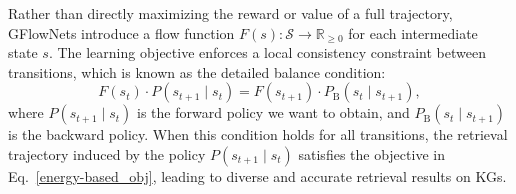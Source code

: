 Rather than directly maximizing the reward or value of a full trajectory, GFlowNets introduce a flow function $F(s): \mathcal{S} \rightarrow \mathbb{R}_{\ge 0}$ for each intermediate state $s$. 
The learning objective enforces a local consistency constraint between transitions, which is known as the detailed balance condition:
\begin{equation} 
F(s_t) \cdot P(s_{t+1} \mid s_t) = F(s_{t+1}) \cdot P_{\text{B}}(s_t \mid s_{t+1}),
\end{equation}
where $P(s_{t+1} \mid s_t)$ is the forward policy we want to obtain, and $P_{\text{B}}(s_t \mid s_{t+1})$ is the backward policy. 
When this condition holds for all transitions, the retrieval trajectory induced by the policy $P(s_{t+1} \mid s_t)$ satisfies the objective in Eq.~\ref{energy-based_obj}, leading to diverse and accurate retrieval results on KGs.


